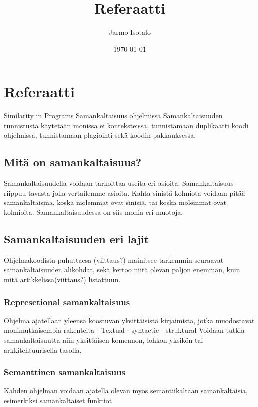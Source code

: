 \documentclass[finnish]{tktltiki2}
\title{Referaatti}
\author{Jarmo Isotalo}
\date{\today}
\theoremstyle{definition}
\theoremstyle{remark}
\begin{document}

\frontmatter      %

\maketitle        %
\makeabstract     %

\tableofcontents  %


\mainmatter       %
\section{Referaatti}
Similarity in Programs
Samankaltaisuus ohjelmissa
Samankaltaisuuden tunnistusta käytetään monissa ei konteksteissa, tunnistamaan duplikaatti koodi ohjelmissa, tunnistamaan plagiointi sekä koodin pakkauksessa.

\subsection{Mitä on samankaltaisuus?}
Samankaltaisuudella voidaan tarkoittaa useita eri asioita. Samankaltaisuus riippuu tavasta jolla vertailemme asioita. Kahta sinistä kolmiota voidaan pitää samankaltaisina, koska molemmat ovat sinisiä, tai koska molemmat ovat kolmioita. Samankaltaisuudessa on siis monia eri muotoja.


\subsection{Samankaltaisuuden eri lajit}
Ohjelmakoodista puhuttaesa (viittaus?) mainitsee tarkemmin seuraavat samankaltaisuuden alikohdat, sekä kertoo niitä olevan paljon enemmän, kuin mitä artikkelissa(viittaus?) listattuun.
\subsubsection{Represetional samankaltaisuus}
Ohjelma ajatellaan yleensä koostuvan yksittäisistä kirjaimista, jotka muodostavat monimutkaisempia rakenteita
- Textual
- syntactic
- struktural
Voidaan tutkia samankaltaisuutta niin yksittäisen komennon, lohkon yksikön tai arkkitehtuurisella tasolla.
\subsubsection{Semanttinen samankaltaisuus}
Kahden ohjelman voidaan ajatella olevan myös semantiikaltaan samankaltaisia, esimerkiksi samankaltaiset funktiot
\end{document}
